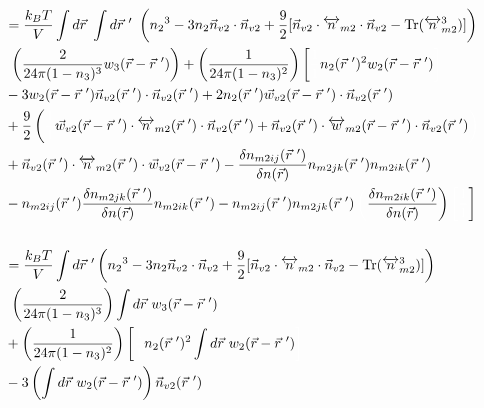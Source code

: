\documentclass[double,12pt]{revtex4-2}
\begin{document}
\begin{align}   %
&=\frac{k_BT}{V}\int d\vec r~\int d\vec r~'~ \left( {n_2}^3-3n_2
    \vec{n}_{v2}\cdot\vec{n}_{v2} 
     +\frac{9}{2}[\vec{n}_{v2}\cdot{\overleftrightarrow{n}_{m2}}\cdot{
     \vec{n}_{v2}}-\operatorname{Tr}({\overleftrightarrow{n}^3_{m2}})]
     \right) \nonumber\\
     &~\left(\frac{2}{24\pi(1-n_3)^3} w_3(\vec r-\vec r~')
     \right) 
     + \left(\frac{1}{24\pi(1-n_3)^2}\right)\left[\color{white}\frac{1}{1}
     \color{black}n_2(\vec r~')^2
     w_2(\vec r-\vec r~') \color{white}\right] \nonumber\\
     &- 3w_2(\vec r-\vec r~')\vec n_{v2}
     (\vec r~') \cdot \vec n_{v2}(\vec r~') + 2n_2(\vec r~')
     \vec w_{v2}(\vec r-\vec r~')\cdot \vec n_{v2}(\vec r~') \nonumber \\
     &+\frac{9}{2}\left(\color{white}\frac{1}{1}\color{black}\vec w_{v2}
     (\vec r-\vec r~')
     \cdot \overleftrightarrow n_{m2}(\vec r~')\cdot \vec n_{v2}( \vec r~')
     +\vec n_{v2}(\vec r~')\cdot \overleftrightarrow w_{m2}(\vec r-\vec r~')
     \cdot \vec n_{v2}( \vec r~')\color{white}\right) \nonumber\\
     &+ \vec n_{v2}(\vec r~')\cdot \overleftrightarrow n_{m2}(\vec r~') 
     \cdot \vec w_{v2}(\vec r-\vec r~')
     -\frac{\delta n_{m2ij}(\vec r~')}{\delta n(\vec r)}n_{m2jk}(\vec r~')
     n_{m2ik}(\vec r~') \nonumber \\     
     &-\color{black}n_{m2ij}(\vec r~')\frac{\delta n_{m2jk}(\vec r~')}
     {\delta n(\vec r)}n_{m2ik}(\vec r~') - n_{m2ij}(\vec r~')n_{m2jk}
     (\vec r~')\color{white}\left(\color{black}\frac{\delta n_{m2ik}(\vec r~')}
     {\delta n(\vec r)}\right)
     \color{white}\left[\frac{1}{1}\color{black}\right]   \\ \nonumber \\
%
&=\frac{k_BT}{V}\int d\vec r~' \left( {n_2}^3-3n_2
    \vec{n}_{v2}\cdot\vec{n}_{v2} 
     +\frac{9}{2}[\vec{n}_{v2}\cdot{\overleftrightarrow{n}_{m2}}\cdot{
     \vec{n}_{v2}}-\operatorname{Tr}({\overleftrightarrow{n}^3_{m2}})]
     \right) \nonumber\\
     &~\left(\frac{2}{24\pi(1-n_3)^3}\right) \int d\vec r~ w_3(\vec r
     -\vec r~') \nonumber\\
     &+\left(\frac{1}{24\pi(1-n_3)^2}\right)\left[
     \color{white}\frac{1}{1}\color{black}n_2(\vec r~')^2
     \int d\vec r~ w_2(\vec r-\vec r~')
     \color{white}\right]\nonumber\\
     &- 3\left(\int d\vec r ~w_2(\vec r-\vec r~')\right)\vec n_{v2}(\vec r~')

\end{align}
\end{document}
